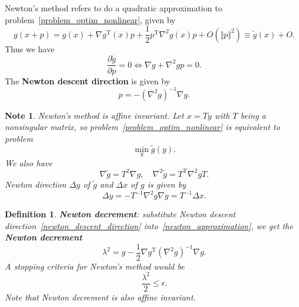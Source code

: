 \documentclass{fancydoc}
\newtheorem{mydef}{Definition}
\newtheorem{note}{Note}
\newcommand{\trans}{\mathrm{T}}
\begin{document}
Newton's method refers to do a quadratic approximation to problem~\eqref{problem_optim_nonlinear}, given by
\begin{equation}\label{newton_approximation}
g(x + p) = g(x) + \nabla g^{\trans}(x)p + \frac{1}{2}p^\trans\nabla^2g(x)p + O(\Vert p\Vert^2) \equiv \tilde{g}(x) + O.
\end{equation}
Thus we have
\begin{equation*}
\frac{\partial \tilde{g}}{\partial p} = 0 \Longleftrightarrow \nabla g + \nabla^2 gp = 0.
\end{equation*}
The \textbf{Newton descent direction} is given by
\begin{equation}\label{newton_descent_direction}
p = -(\nabla^2g)^{-1}\nabla g.
\end{equation}
\bigbreak
\begin{note}
	Newton's method is affine invariant. Let $x=Ty$ with $T$ being a nonsingular matrix, so problem~\eqref{problem_optim_nonlinear} is equivalent to problem 
	\begin{equation}
	\min_{y} \tilde{g}(y).
	\end{equation}
	We also have 
	\begin{equation*}
	\nabla \tilde{g} = T^2 \nabla g, \quad \nabla^2 \tilde{g} = T^
	\trans \nabla^2 g T.
	\end{equation*}
	Newton direction $\Delta y$ of $\tilde{g}$ and $\Delta x$ of $g$ is given by
	\begin{equation*}
	\Delta y = -T^{-1}\nabla^2 g \nabla g = T^{-1} \Delta x.
	\end{equation*}
\end{note}

\begin{mydef}
	\textbf{Newton decrement}: substitute Newton descent direction~\eqref{newton_descent_direction} into~\eqref{newton_approximation}, we get the \textbf{Newton decrement} 
	\begin{equation}
	\lambda^2 = g - \frac{1}{2}\nabla g^\trans(\nabla^2 g)^{-1}\nabla g.
	\end{equation} 
	A stopping criteria for Newton's method would be
	\begin{equation*}
	\frac{\lambda^2}{2} \leq \epsilon.
	\end{equation*}
	Note that Newton decrement is also affine invariant.
\end{mydef}
\bigbreak 
\end{document}

